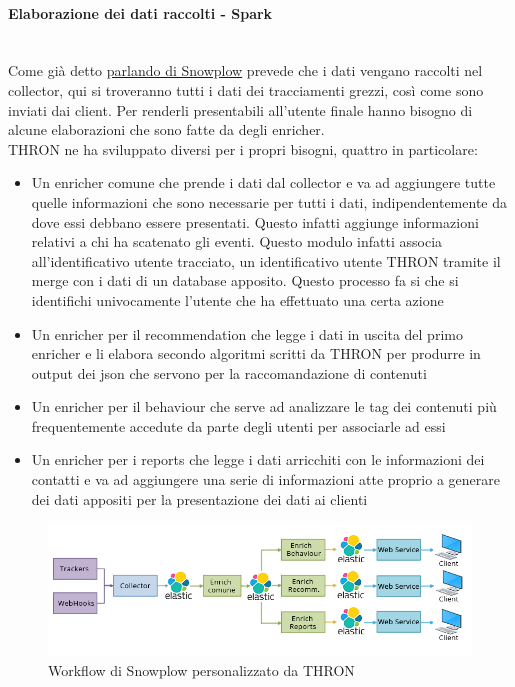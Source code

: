 \documentclass[a4paper, 12pt, twoside, openright]{book}
\begin{document}
\paragraph{Elaborazione dei dati raccolti - Spark}\mbox{} \\
Come già detto \hyperref[snowplow]{parlando di Snowplow} prevede che i dati vengano raccolti nel collector, qui si troveranno tutti i dati dei tracciamenti grezzi, così come sono inviati dai client. Per renderli presentabili all'utente finale hanno bisogno di alcune elaborazioni che sono fatte da degli enricher.\\
THRON ne ha sviluppato diversi per i propri bisogni, quattro in particolare:
\begin{itemize}
	\item Un enricher comune che prende i dati dal collector e va ad aggiungere tutte quelle informazioni che sono necessarie per tutti i dati, indipendentemente da dove essi debbano essere presentati. Questo infatti aggiunge informazioni relativi a chi ha scatenato gli eventi. Questo modulo infatti associa all'identificativo utente tracciato, un identificativo utente THRON tramite il merge con i dati di un database apposito. Questo processo fa si che si identifichi univocamente l'utente che ha effettuato una certa azione
	\item Un enricher per il recommendation che legge i dati in uscita del primo enricher e li elabora secondo algoritmi scritti da THRON per produrre in output dei json che servono per la raccomandazione di contenuti
	\item Un enricher per il behaviour che serve ad analizzare le tag dei contenuti più frequentemente accedute da parte degli utenti per associarle ad essi
	\item Un enricher per i reports che legge i dati arricchiti con le informazioni dei contatti e va ad aggiungere una serie di informazioni atte proprio a generare dei dati appositi per la presentazione dei dati ai clienti 
\end{itemize}
\begin{figure}[H]
	\centering
	\label{snowplow-workflow-thron}	\includegraphics[width=1.0\textwidth]{images/snowplow-workflow-thron.jpg}
	\caption{Workflow di Snowplow personalizzato da THRON}
\end{figure} 
\end{document}
